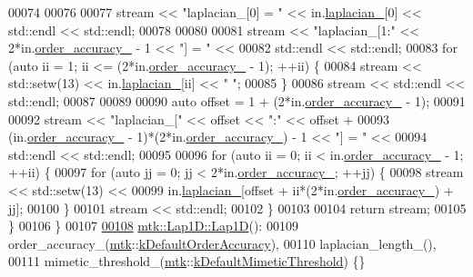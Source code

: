 \begin{DoxyCode}
00074 
00076 
00077   stream << \textcolor{stringliteral}{"laplacian\_[0] = "} << in.\hyperlink{classmtk_1_1Lap1D_a64a3977527c00b4ef994d1bd549f82fd}{laplacian\_}[0] << std::endl << std::endl;
00078 
00080 
00081   stream << \textcolor{stringliteral}{"laplacian\_[1:"} << 2*in.\hyperlink{classmtk_1_1Lap1D_a35d34c085b9cf6f9961a699dfb02fea6}{order\_accuracy\_} - 1 << \textcolor{stringliteral}{"] = "} <<
00082     std::endl << std::endl;
00083   \textcolor{keywordflow}{for} (\textcolor{keyword}{auto} ii = 1; ii <= (2*in.\hyperlink{classmtk_1_1Lap1D_a35d34c085b9cf6f9961a699dfb02fea6}{order\_accuracy\_} - 1); ++ii) \{
00084     stream << std::setw(13) << in.\hyperlink{classmtk_1_1Lap1D_a64a3977527c00b4ef994d1bd549f82fd}{laplacian\_}[ii] << \textcolor{stringliteral}{" "};
00085   \}
00086   stream << std::endl << std::endl;
00087 
00089 
00090   \textcolor{keyword}{auto} offset = 1 + (2*in.\hyperlink{classmtk_1_1Lap1D_a35d34c085b9cf6f9961a699dfb02fea6}{order\_accuracy\_} - 1);
00091 
00092   stream << \textcolor{stringliteral}{"laplacian\_["} << offset << \textcolor{stringliteral}{":"} << offset +
00093     (in.\hyperlink{classmtk_1_1Lap1D_a35d34c085b9cf6f9961a699dfb02fea6}{order\_accuracy\_} - 1)*(2*in.\hyperlink{classmtk_1_1Lap1D_a35d34c085b9cf6f9961a699dfb02fea6}{order\_accuracy\_}) - 1 << \textcolor{stringliteral}{"] = "} <<
00094     std::endl << std::endl;
00095 
00096   \textcolor{keywordflow}{for} (\textcolor{keyword}{auto} ii = 0; ii < in.\hyperlink{classmtk_1_1Lap1D_a35d34c085b9cf6f9961a699dfb02fea6}{order\_accuracy\_} - 1; ++ii) \{
00097     \textcolor{keywordflow}{for} (\textcolor{keyword}{auto} jj = 0; jj < 2*in.\hyperlink{classmtk_1_1Lap1D_a35d34c085b9cf6f9961a699dfb02fea6}{order\_accuracy\_}; ++jj) \{
00098       stream << std::setw(13) <<
00099         in.\hyperlink{classmtk_1_1Lap1D_a64a3977527c00b4ef994d1bd549f82fd}{laplacian\_}[offset + ii*(2*in.\hyperlink{classmtk_1_1Lap1D_a35d34c085b9cf6f9961a699dfb02fea6}{order\_accuracy\_}) + jj];
00100     \}
00101     stream << std::endl;
00102   \}
00103 
00104   \textcolor{keywordflow}{return} stream;
00105 \}
00106 \}
00107 
\hypertarget{mtk__lap__1d_8cc_source_l00108}{}\hyperlink{classmtk_1_1Lap1D_a6fc2aeea35d4dfa49f17e625411f5a70}{00108} \hyperlink{classmtk_1_1Lap1D_a6fc2aeea35d4dfa49f17e625411f5a70}{mtk::Lap1D::Lap1D}():
00109   order\_accuracy\_(\hyperlink{namespacemtk}{mtk}::\hyperlink{group__c01-roots_ga0d95560098eb36420511103637b6952f}{kDefaultOrderAccuracy}),
00110   laplacian\_length\_(),
00111   mimetic\_threshold\_(\hyperlink{namespacemtk}{mtk}::\hyperlink{group__c01-roots_ga35718d949bdc81a08a9cc8ebbe3478a2}{kDefaultMimeticThreshold}) \{\}

\end{DoxyCode}

